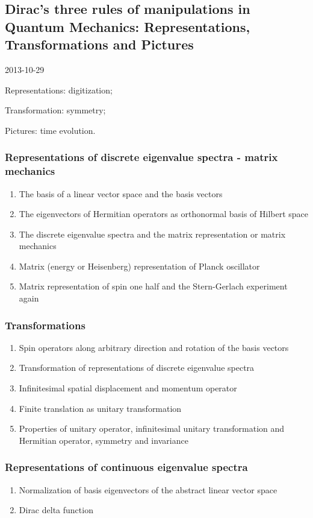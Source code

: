 \documentclass[12pt]{article}
\numberwithin{equation}{section}
\begin{document}
\subsection{Dirac's three rules of manipulations in Quantum Mechanics: 
                       Representations, Transformations and Pictures}
         2013-10-29 \par
	Representations: digitization; \par
	Transformation: symmetry; \par   
	Pictures: time evolution.                               
\subsubsection{Representations of discrete eigenvalue spectra - matrix mechanics}
\begin{enumerate}
\item The basis of a linear vector space and the basis vectors
\item The eigenvectors of Hermitian operators as orthonormal basis of Hilbert space
\item The discrete eigenvalue spectra and the matrix representation or matrix mechanics
\item Matrix (energy or Heisenberg) representation of Planck oscillator
\item Matrix representation of spin one half and the Stern-Gerlach experiment again
\end{enumerate}
\subsubsection{Transformations}
\begin{enumerate}
\item Spin operators along arbitrary direction and rotation of the basis vectors
\item Transformation of representations of discrete eigenvalue spectra
\item Infinitesimal spatial displacement and momentum operator
\item Finite translation as unitary transformation
\item Properties of unitary operator, infinitesimal unitary transformation and Hermitian operator, symmetry and invariance
\end{enumerate}
\subsubsection{Representations of continuous eigenvalue spectra}
\begin{enumerate}
\item Normalization of basis eigenvectors of the abstract linear vector space
\item Dirac delta function
\end{enumerate}
\end{document}
